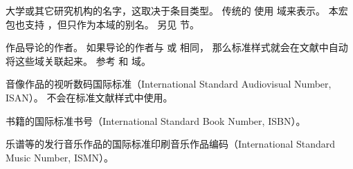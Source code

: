 \begin{fieldlist}



大学或其它研究机构的名字，这取决于条目类型。
传统的 \BibTeX 使用  域来表示。
本宏包也支持 ，但只作为本域的别名。
另见  节。




作品导论的作者。
如果导论的作者与  或  相同，
那么标准样式就会在文献中自动将这些域关联起来。
参考  和  域。




音像作品的视听数码国际标准（International Standard Audiovisual Number,  ISAN）。
不会在标准文献样式中使用。




书籍的国际标准书号（International Standard Book Number, ISBN）。




乐谱等的发行音乐作品的国际标准印刷音乐作品编码（International Standard Music Number,  ISMN）。



\end{fieldlist}
